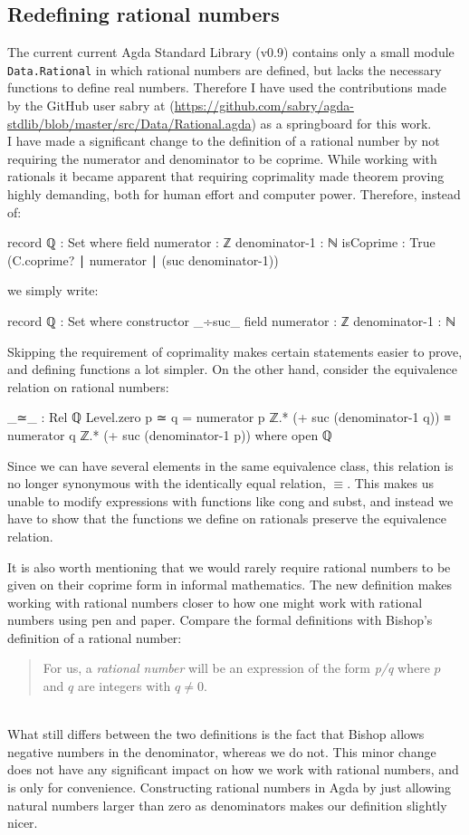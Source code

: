 \documentclass[11pt,a4paper]{article}
\begin{document}
\subsection{Redefining rational numbers}
The current current Agda Standard Library (v0.9) contains only a small module \texttt{Data.Rational} in which rational numbers are defined, but lacks the necessary functions to define real numbers. Therefore I have used the contributions made by the GitHub user sabry at (\url{https://github.com/sabry/agda-stdlib/blob/master/src/Data/Rational.agda}) as a springboard for this work. \\
I have made a significant change to the definition of a rational number by not requiring the numerator and denominator to be coprime. While working with rationals it became apparent that requiring coprimality made theorem proving highly demanding, both for human effort and computer power. Therefore, instead of:
\begin{code}
record ℚ : Set where
  field
    numerator     : ℤ
    denominator-1 : ℕ
    isCoprime     : True (C.coprime? ∣ numerator ∣ (suc denominator-1))
\end{code}
we simply write:
\begin{code}
record ℚ : Set where
  constructor _÷suc_
  field
    numerator     : ℤ
    denominator-1 : ℕ
\end{code}
Skipping the requirement of coprimality makes certain statements easier to prove, and defining functions a lot simpler. On the other hand, consider the equivalence relation on rational numbers:
\begin{code}
_≃_ : Rel ℚ Level.zero
p ≃ q = numerator p ℤ.* (+ suc (denominator-1 q)) ≡
        numerator q ℤ.* (+ suc (denominator-1 p))
  where open ℚ
\end{code}
Since we can have several elements in the same equivalence class, this relation is no longer synonymous with the identically equal relation, $\equiv$. This makes us unable to modify expressions with functions like cong and subst, and instead we have to show that the functions we define on rationals preserve the equivalence relation.

It is also worth mentioning that we would rarely require rational numbers to be given on their coprime form in informal mathematics. The new definition makes working with rational numbers closer to how one might work with rational numbers using pen and paper. Compare the formal definitions with Bishop's definition of a rational number:\\
\blockquote{
For us, a \textit{rational number} will be an expression of the form \textit{p/q} where $p$ and $q$ are integers with $q\neq0$.
}\\
What still differs between the two definitions is the fact that Bishop allows negative numbers in the denominator, whereas we do not. This minor change does not have any significant impact on how we work with rational numbers, and is only for convenience. Constructing rational numbers in Agda by just allowing natural numbers larger than zero as denominators makes our definition slightly nicer.
\end{document}

